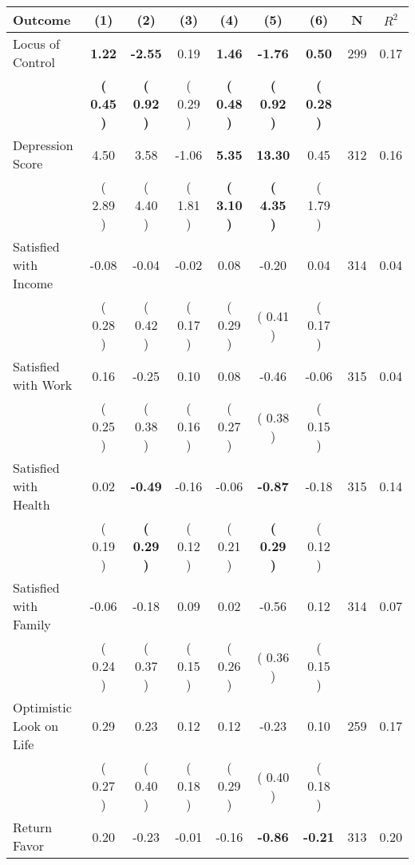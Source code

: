 \begin{tabular}{lcccccccc}
\toprule
 \textbf{Outcome} & \textbf{(1)} & \textbf{(2)} & \textbf{(3)} & \textbf{(4)} & \textbf{(5)} & \textbf{(6)} & \textbf{N} & \textbf{$ R^2$} \\
\midrule
Locus of Control & \textbf{     1.22} & \textbf{    -2.55} &      0.19 & \textbf{     1.46} & \textbf{    -1.76} & \textbf{     0.50} & 299 &       0.17 \\ 
 & \textbf{(     0.45 )} & \textbf{(     0.92 )} & (     0.29 ) & \textbf{(     0.48 )} & \textbf{(     0.92 )} & \textbf{(     0.28 )} & \\
Depression Score &      4.50 &      3.58 &     -1.06 & \textbf{     5.35} & \textbf{    13.30} &      0.45 & 312 &       0.16 \\ 
 & (     2.89 ) & (     4.40 ) & (     1.81 ) & \textbf{(     3.10 )} & \textbf{(     4.35 )} & (     1.79 ) & \\
Satisfied with Income &     -0.08 &     -0.04 &     -0.02 &      0.08 &     -0.20 &      0.04 & 314 &       0.04 \\ 
 & (     0.28 ) & (     0.42 ) & (     0.17 ) & (     0.29 ) & (     0.41 ) & (     0.17 ) & \\
Satisfied with Work &      0.16 &     -0.25 &      0.10 &      0.08 &     -0.46 &     -0.06 & 315 &       0.04 \\ 
 & (     0.25 ) & (     0.38 ) & (     0.16 ) & (     0.27 ) & (     0.38 ) & (     0.15 ) & \\
Satisfied with Health &      0.02 & \textbf{    -0.49} &     -0.16 &     -0.06 & \textbf{    -0.87} &     -0.18 & 315 &       0.14 \\ 
 & (     0.19 ) & \textbf{(     0.29 )} & (     0.12 ) & (     0.21 ) & \textbf{(     0.29 )} & (     0.12 ) & \\
Satisfied with Family &     -0.06 &     -0.18 &      0.09 &      0.02 &     -0.56 &      0.12 & 314 &       0.07 \\ 
 & (     0.24 ) & (     0.37 ) & (     0.15 ) & (     0.26 ) & (     0.36 ) & (     0.15 ) & \\
Optimistic Look on Life &      0.29 &      0.23 &      0.12 &      0.12 &     -0.23 &      0.10 & 259 &       0.17 \\ 
 & (     0.27 ) & (     0.40 ) & (     0.18 ) & (     0.29 ) & (     0.40 ) & (     0.18 ) & \\
Return Favor &      0.20 &     -0.23 &     -0.01 &     -0.16 & \textbf{    -0.86} & \textbf{    -0.21} & 313 &       0.20 \\ 

\end{tabular}
